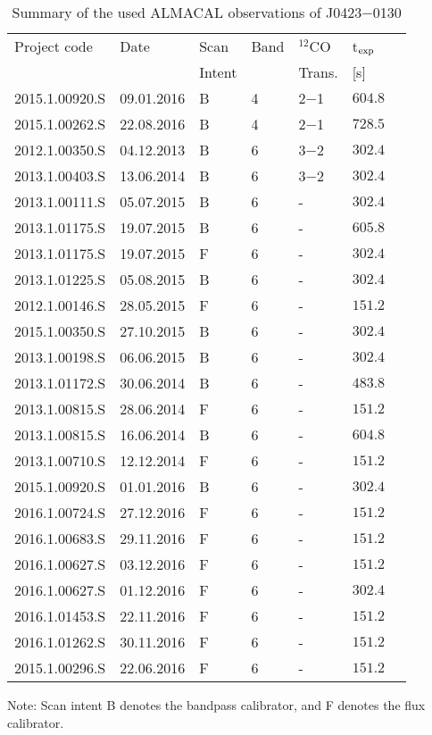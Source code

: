 \documentclass[a4paper,fleqn,usenatbib]{mnras}
\begin{document}
\begin{table}
\caption{Summary of the used ALMACAL observations of J0423$-$0130}
\label{TabObsPropALMA}
\begin{minipage}{\linewidth}
\begin{tabular}{l l l l l l l }
\hline
Project code & Date & Scan & Band & $^{12}$CO & t$_{\rm exp}$\\
& & Intent& & Trans. & [s]\\
\hline
2015.1.00920.S & 09.01.2016 & B & 4 & 2$-$1 & $604.8$ \\
2015.1.00262.S & 22.08.2016 & B & 4 & 2$-$1 & $728.5$ \\
2012.1.00350.S & 04.12.2013 & B & 6 & 3$-$2 & $302.4$\\
2013.1.00403.S & 13.06.2014 & B & 6 & 3$-$2 & $302.4$\\
2013.1.00111.S & 05.07.2015 & B & 6 & - & $302.4$\\
2013.1.01175.S & 19.07.2015 & B & 6 & - & $605.8$\\
2013.1.01175.S & 19.07.2015 & F & 6 & - &  $302.4$\\
2013.1.01225.S & 05.08.2015 & B & 6 & - & $302.4$\\
2012.1.00146.S & 28.05.2015 & F & 6 & - & $151.2$\\
2015.1.00350.S & 27.10.2015 & B & 6 & - & $302.4$\\
2013.1.00198.S & 06.06.2015 & B & 6 & - & $302.4$\\
2013.1.01172.S & 30.06.2014 & B & 6 & - & $483.8$\\
2013.1.00815.S & 28.06.2014 & F & 6 & - & $151.2$\\
2013.1.00815.S & 16.06.2014 & B & 6 & - & $604.8$\\
2013.1.00710.S & 12.12.2014 & F & 6 & - & $151.2$\\
2015.1.00920.S & 01.01.2016 & B & 6 & - & $302.4$\\
2016.1.00724.S & 27.12.2016 & F & 6 & - & $151.2$\\
2016.1.00683.S & 29.11.2016 & F & 6 & - & $151.2$\\
2016.1.00627.S & 03.12.2016 & F & 6 & - & $151.2$\\
2016.1.00627.S & 01.12.2016 & F & 6 & - & $302.4$\\
2016.1.01453.S & 22.11.2016 & F & 6 & - & $151.2$\\
2016.1.01262.S & 30.11.2016 & F & 6 & - & $151.2$\\
2015.1.00296.S & 22.06.2016 & F & 6 & - & $151.2$\\
\hline
\end{tabular}
\end{minipage}
\begin{minipage}{\linewidth}
Note: Scan intent B denotes the bandpass calibrator, and F denotes the flux calibrator.
\end{minipage}
\end{table}
\end{document}
